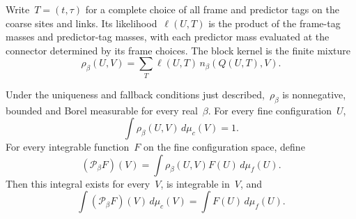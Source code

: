 Write~$T=(t,\tau)$ for a complete choice of all frame and predictor tags on the coarse sites and links. Its likelihood~$\ell(U,T)$ is the product of the frame-tag masses and predictor-tag masses, with each predictor mass evaluated at the connector determined by its frame choices. The block kernel is the finite mixture
\begin{equation}\label{eq:uv-block-kernel}
 \rho_\beta(U,V)=\sum_T\ell(U,T)\,n_\beta\!\left(Q(U,T),V\right).
\end{equation}
\begin{proposition}\label{prop:uv-block-kernel}
Under the uniqueness and fallback conditions just described,~$\rho_\beta$ is nonnegative, bounded and Borel measurable for every real~$\beta$. For every fine configuration~$U$,
\begin{equation}\label{eq:uv-block-kernel-mass}
 \int\rho_\beta(U,V)\,d\mu_c(V)=1.
\end{equation}
For every integrable function~$F$ on the fine configuration space, define
\begin{equation}\label{eq:uv-block-push}
 (\mathcal P_\beta F)(V)=\int\rho_\beta(U,V)F(U)\,d\mu_f(U).
\end{equation}
Then this integral exists for every~$V$, is integrable in~$V$, and
\begin{equation}\label{eq:uv-block-preservation}
 \int(\mathcal P_\beta F)(V)\,d\mu_c(V)
 =\int F(U)\,d\mu_f(U).
\end{equation}
\end{proposition}


